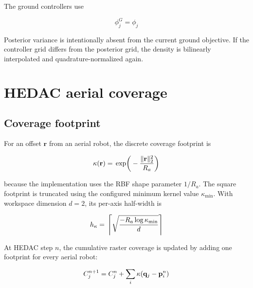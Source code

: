 \documentclass[11pt]{article}
\begin{document}
The ground controllers use


\begin{equation}
\phi^G_j=\phi_j
\end{equation}


Posterior variance is intentionally absent from the current ground objective. If the controller grid differs from the posterior grid, the density is bilinearly interpolated and quadrature-normalized again.


\section{HEDAC aerial coverage}


\subsection{Coverage footprint}


For an offset $\mathbf r$ from an aerial robot, the discrete coverage footprint is


\begin{equation}
\kappa(\mathbf r) \\
= \\
\exp\!\left( \\
-\frac{\lVert\mathbf r\rVert_2^2}{R_a} \\
\right)
\end{equation}


because the implementation uses the RBF shape parameter $1/R_a$. The square footprint is truncated using the configured minimum kernel value $\kappa_{\min}$. With workspace dimension $d=2$, its per-axis half-width is


\begin{equation}
h_\kappa \\
= \\
\left\lceil \\
\sqrt{ \\
\frac{-R_a\log\kappa_{\min}}{d} \\
} \\
\right\rceil
\end{equation}


At HEDAC step $n$, the cumulative raster coverage is updated by adding one footprint for every aerial robot:


\begin{equation}
C_j^{n+1} \\
= \\
C_j^n+\sum_i\kappa(\mathbf q_j-\mathbf p_i^n)
\end{equation}
\end{document}
